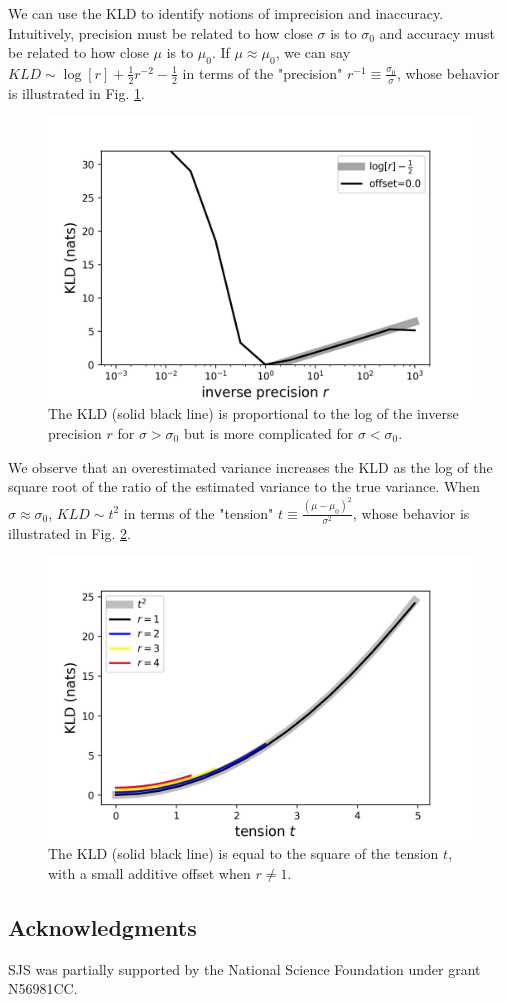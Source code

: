 \documentclass[\docopts]{\docclass}
\begin{document}
We can use the KLD to identify notions of imprecision and inaccuracy.
Intuitively, precision must be related to how close $\sigma$ is to $\sigma_{0}$
and accuracy must be related to how close $\mu$ is to $\mu_{0}$.  If
$\mu\approx\mu_{0}$, we can say $KLD\sim\log[r] + \frac{1}{2}r^{-2} -
\frac{1}{2}$ in terms of the "precision"
$r^{-1}\equiv\frac{\sigma_{0}}{\sigma}$, whose behavior is illustrated in Fig.
\ref{fig:precision}.
\begin{figure}
  \includegraphics[width=0.9\columnwidth]{figures/kld_precision.png}
  \caption{The KLD (solid black line) is proportional to the log of the inverse
precision $r$ for $\sigma>\sigma_{0}$ but is more complicated for
$\sigma<\sigma_{0}$.
  \label{fig:precision}}
\end{figure}
We observe that an overestimated variance increases the KLD as the log of the
square root of the ratio of the estimated variance to the true variance.  When
$\sigma\approx\sigma_{0}$, $KLD\sim t^{2}$ in terms of the "tension"
$t\equiv\frac{(\mu-\mu_{0})^{2}}{\sigma^{2}}$, whose behavior is illustrated in
Fig. \ref{fig:tension}.
\begin{figure}
  \includegraphics[width=0.9\columnwidth]{figures/kld_tension.png}
  \caption{The KLD (solid black line) is equal to the square of the tension
$t$, with a small additive offset when $r\neq1$.
  \label{fig:tension}}
\end{figure}

\subsection*{Acknowledgments}


SJS was partially supported by the National Science Foundation under grant
N56981CC.








\end{document}
